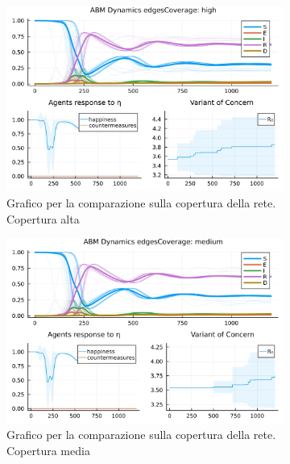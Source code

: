 \begin{figure}[H]
	\centering
	\begin{subfigure}[b]{0.3\textwidth}
		\centering
		\includegraphics[width=\textwidth]{img/SocialNetworkABM_1_EC.jpg}
		\caption{Grafico per la comparazione sulla copertura della rete. Copertura alta}
		\label{fig:comparison_highCoverage}
	\end{subfigure}
	\hfill
	\begin{subfigure}[b]{0.3\textwidth}
		\centering
		\includegraphics[width=\textwidth]{img/SocialNetworkABM_2_EC.jpg}
		\caption{Grafico per la comparazione sulla copertura della rete. Copertura media}
		\label{fig:comparison_mediumCoverage}
	\end{subfigure}
	\hfill
	\begin{subfigure}[b]{0.3\textwidth}
		\centering

\end{subfigure}
\end{figure}
